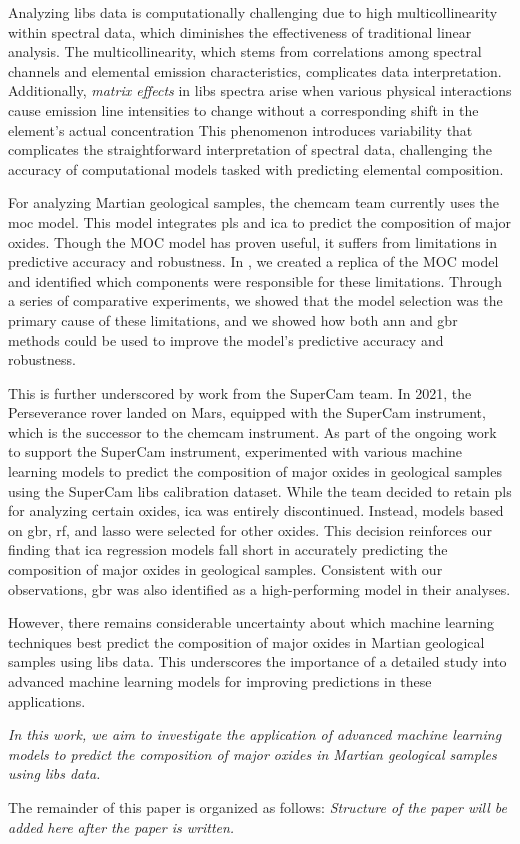 Analyzing \gls{libs} data is computationally challenging due to high multicollinearity within spectral data, which diminishes the effectiveness of traditional linear analysis.
The multicollinearity, which stems from correlations among spectral channels and elemental emission characteristics, complicates data interpretation.
Additionally, \textit{matrix effects} in \gls{libs} spectra arise when various physical interactions cause emission line intensities to change without a corresponding shift in the element's actual concentration
This phenomenon introduces variability that complicates the straightforward interpretation of spectral data, challenging the accuracy of computational models tasked with predicting elemental composition.\cite{andersonImprovedAccuracyQuantitative2017}

For analyzing Martian geological samples, the \gls{chemcam} team currently uses the \gls{moc} model\cite{cleggRecalibrationMarsScience2017}.
This model integrates \gls{pls} and \gls{ica} to predict the composition of major oxides.
Though the MOC model has proven useful, it suffers from limitations in predictive accuracy and robustness.
In \citet{p9_paper}, we created a replica of the MOC model and identified which components were responsible for these limitations.
Through a series of comparative experiments, we showed that the model selection was the primary cause of these limitations, and we showed how both \gls{ann} and \gls{gbr} methods could be used to improve the model's predictive accuracy and robustness.

This is further underscored by work from the SuperCam team.
In 2021, the Perseverance rover landed on Mars, equipped with the SuperCam instrument, which is the successor to the \gls{chemcam} instrument.
As part of the ongoing work to support the SuperCam instrument, \citet{andersonPostlandingMajorElement2022} experimented with various machine learning models to predict the composition of major oxides in geological samples using the SuperCam \gls{libs} calibration dataset.
While the team decided to retain \gls{pls} for analyzing certain oxides, \gls{ica} was entirely discontinued.
Instead, models based on \gls{gbr}, \gls{rf}, and \gls{lasso} were selected for other oxides.
This decision reinforces our finding that \gls{ica} regression models fall short in accurately predicting the composition of major oxides in geological samples.
Consistent with our observations, \gls{gbr} was also identified as a high-performing model in their analyses.

However, there remains considerable uncertainty about which machine learning techniques best predict the composition of major oxides in Martian geological samples using \gls{libs} data.
This underscores the importance of a detailed study into advanced machine learning models for improving predictions in these applications.

\textit{In this work, we aim to investigate the application of advanced machine learning models to predict the composition of major oxides in Martian geological samples using \gls{libs} data.}

The remainder of this paper is organized as follows:
\textit{Structure of the paper will be added here after the paper is written.}
